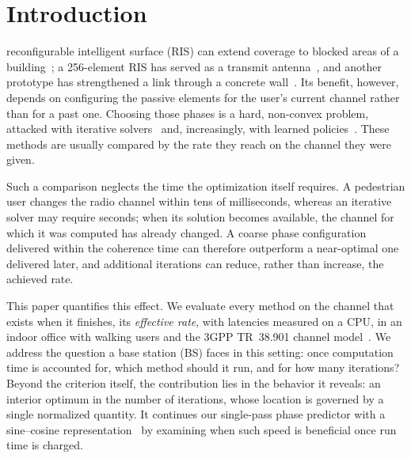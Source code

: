 \section{Introduction}
\label{sec:intro}

 reconfigurable intelligent surface (RIS) can extend coverage to blocked areas of a building~\cite{Basar2019Access,DiRenzo2020JSAC,Wu2021TCOM}; a 256-element RIS has served as a transmit antenna~\cite{Dai2020Access}, and another prototype has strengthened a link through a concrete wall~\cite{Pei2021TCOM}. Its benefit, however, depends on configuring the passive elements for the user's current channel rather than for a past one. Choosing those phases is a hard, non-convex problem, attacked with iterative solvers~\cite{Wu2019TWC,Abeywickrama2020TCOM,Pan2020TWC,Guo2020TWC,Choi2024TCOM} and, increasingly, with learned policies~\cite{Huang2020JSAC}. These methods are usually compared by the rate they reach on the channel they were given.

Such a comparison neglects the time the optimization itself requires. A pedestrian user changes the radio channel within tens of milliseconds, whereas an iterative solver may require seconds; when its solution becomes available, the channel for which it was computed has already changed. A coarse phase configuration delivered within the coherence time can therefore outperform a near-optimal one delivered later, and additional iterations can reduce, rather than increase, the achieved rate.

This paper quantifies this effect. We evaluate every method on the channel that exists when it finishes, its \emph{effective rate}, with latencies measured on a CPU, in an indoor office with walking users and the 3GPP TR~38.901 channel model~\cite{3gpp_channel}. We address the question a base station (BS) faces in this setting: once computation time is accounted for, which method should it run, and for how many iterations? Beyond the criterion itself, the contribution lies in the behavior it reveals: an interior optimum in the number of iterations, whose location is governed by a single normalized quantity. It continues our single-pass phase predictor with a sine--cosine representation~\cite{SavasciSen2026AISY} by examining when such speed is beneficial once run time is charged.

